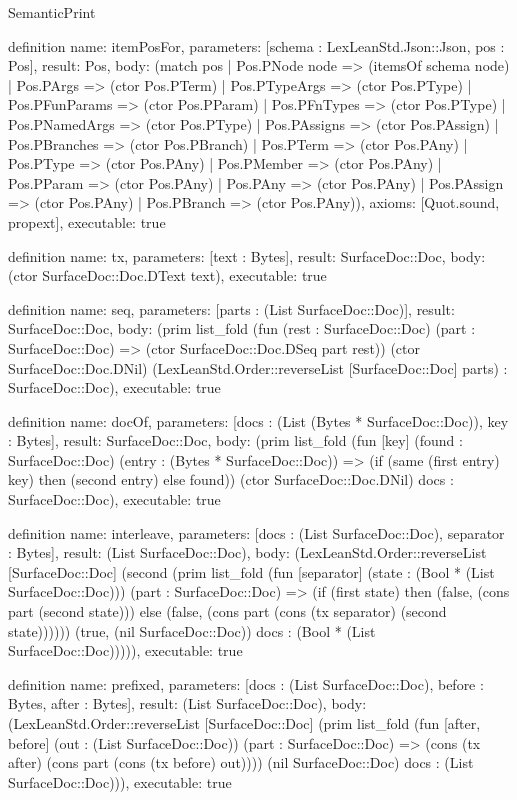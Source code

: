 \begin{lexlean}{SemanticPrint}
\begin{semanticmodule}
definition{
  name: itemPosFor,
  parameters: [schema : LexLeanStd.Json::Json, pos : Pos],
  result: Pos,
  body: (match pos
    | Pos.PNode node => (itemsOf schema node)
    | Pos.PArgs => (ctor Pos.PTerm)
    | Pos.PTypeArgs => (ctor Pos.PType)
    | Pos.PFunParams => (ctor Pos.PParam)
    | Pos.PFnTypes => (ctor Pos.PType)
    | Pos.PNamedArgs => (ctor Pos.PType)
    | Pos.PAssigns => (ctor Pos.PAssign)
    | Pos.PBranches => (ctor Pos.PBranch)
    | Pos.PTerm => (ctor Pos.PAny)
    | Pos.PType => (ctor Pos.PAny)
    | Pos.PMember => (ctor Pos.PAny)
    | Pos.PParam => (ctor Pos.PAny)
    | Pos.PAny => (ctor Pos.PAny)
    | Pos.PAssign => (ctor Pos.PAny)
    | Pos.PBranch => (ctor Pos.PAny)),
  axioms: [Quot.sound, propext],
  executable: true
}

definition{
  name: tx,
  parameters: [text : Bytes],
  result: SurfaceDoc::Doc,
  body: (ctor SurfaceDoc::Doc.DText text),
  executable: true
}

definition{
  name: seq,
  parameters: [parts : (List SurfaceDoc::Doc)],
  result: SurfaceDoc::Doc,
  body: (prim list_fold (fun (rest : SurfaceDoc::Doc) (part : SurfaceDoc::Doc) => (ctor SurfaceDoc::Doc.DSeq part rest)) (ctor SurfaceDoc::Doc.DNil) (LexLeanStd.Order::reverseList [SurfaceDoc::Doc] parts) : SurfaceDoc::Doc),
  executable: true
}

definition{
  name: docOf,
  parameters: [docs : (List (Bytes * SurfaceDoc::Doc)), key : Bytes],
  result: SurfaceDoc::Doc,
  body: (prim list_fold (fun [key] (found : SurfaceDoc::Doc) (entry : (Bytes * SurfaceDoc::Doc)) => (if (same (first entry) key) then (second entry) else found)) (ctor SurfaceDoc::Doc.DNil) docs : SurfaceDoc::Doc),
  executable: true
}

definition{
  name: interleave,
  parameters: [docs : (List SurfaceDoc::Doc), separator : Bytes],
  result: (List SurfaceDoc::Doc),
  body: (LexLeanStd.Order::reverseList [SurfaceDoc::Doc] (second (prim list_fold (fun [separator] (state : (Bool * (List SurfaceDoc::Doc))) (part : SurfaceDoc::Doc) => (if (first state) then (false, (cons part (second state))) else (false, (cons part (cons (tx separator) (second state)))))) (true, (nil SurfaceDoc::Doc)) docs : (Bool * (List SurfaceDoc::Doc))))),
  executable: true
}

definition{
  name: prefixed,
  parameters: [docs : (List SurfaceDoc::Doc), before : Bytes, after : Bytes],
  result: (List SurfaceDoc::Doc),
  body: (LexLeanStd.Order::reverseList [SurfaceDoc::Doc] (prim list_fold (fun [after, before] (out : (List SurfaceDoc::Doc)) (part : SurfaceDoc::Doc) => (cons (tx after) (cons part (cons (tx before) out)))) (nil SurfaceDoc::Doc) docs : (List SurfaceDoc::Doc))),
  executable: true
}


\end{semanticmodule}
\end{lexlean}
